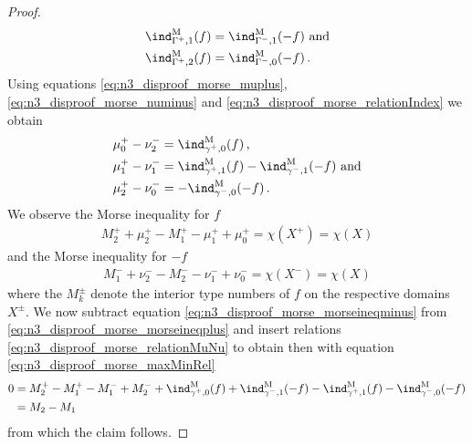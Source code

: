 \begin{proof}
\begin{equation}
\begin{aligned}
      \ind^\text{M}_{\Gamma^+,1}(f)&=\ind^\text{M}_{\Gamma^-,1}(-f)\text{ and} \\
      \ind^\text{M}_{\Gamma^+,2}(f)&=\ind^\text{M}_{\Gamma^-,0}(-f)\,.\label{eq:n3_disproof_morse_relationIndex} 
    \end{aligned}
  \end{equation}
  Using equations \eqref{eq:n3_disproof_morse_muplus}, \eqref{eq:n3_disproof_morse_numinus} and \eqref{eq:n3_disproof_morse_relationIndex}
  we obtain
  \begin{equation}
    \begin{aligned}
      \mu^+_0-\nu^-_2&=\ind^\text{M}_{\gamma^+,0}(f)\,, \\
      \mu^+_1-\nu^-_1&=\ind^\text{M}_{\gamma^+,1}(f)-\ind^\text{M}_{\gamma^-,1}(-f)\text{ and} \\
      \mu^+_2-\nu^-_0&=-\ind^\text{M}_{\gamma^-,0}(-f)\,.
    \end{aligned}\label{eq:n3_disproof_morse_relationMuNu}
  \end{equation}
  We observe the Morse inequality for $f$
  \begin{align}
    M_2^++\mu^+_2-M_1^+-\mu^+_1+\mu^+_0=\chi(X^+)=\chi(X)\label{eq:n3_disproof_morse_morseineqplus}
  \end{align}
  and the Morse inequality for $-f$
  \begin{align}
    M_1^-+\nu^-_2-M_2^--\nu^-_1+\nu^-_0=\chi(X^-)=\chi(X)\label{eq:n3_disproof_morse_morseineqminus}
  \end{align}
  where the $M_k^\pm$ denote the interior type numbers of $f$ on the respective domains $X^\pm$.
  We now subtract equation \eqref{eq:n3_disproof_morse_morseineqminus} from \eqref{eq:n3_disproof_morse_morseineqplus}
  and insert relations \eqref{eq:n3_disproof_morse_relationMuNu} to obtain
  then with equation \eqref{eq:n3_disproof_morse_maxMinRel}
  \begin{align*}
    0&=M_2^+-M_1^+-M_1^-+M_2^-+\ind^\text{M}_{\gamma^+,0}(f)+\ind^\text{M}_{\gamma^-,1}(-f)-\ind^\text{M}_{\gamma^+,1}(f)-\ind^\text{M}_{\gamma^-,0}(-f) \\
    &= M_2-M_1
  \end{align*}
  from which the claim follows.



\end{proof}

